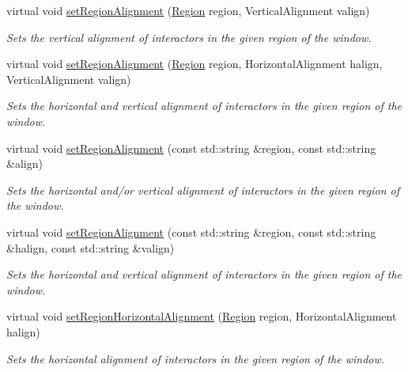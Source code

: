 \begin{DoxyCompactItemize}
virtual void \mbox{\hyperlink{classGWindow_a926942899d029fc9921fe770ac2867bb}{set\+Region\+Alignment}} (\mbox{\hyperlink{classGWindow_a81a01a86de31071a92e6cce0bab9bc4b}{Region}} region, Vertical\+Alignment valign)
\begin{DoxyCompactList}\small\item\em Sets the vertical alignment of interactors in the given region of the window. \end{DoxyCompactList}\item 
virtual void \mbox{\hyperlink{classGWindow_ab4d2bfcca7a18da2847e7b4494da4a16}{set\+Region\+Alignment}} (\mbox{\hyperlink{classGWindow_a81a01a86de31071a92e6cce0bab9bc4b}{Region}} region, Horizontal\+Alignment halign, Vertical\+Alignment valign)
\begin{DoxyCompactList}\small\item\em Sets the horizontal and vertical alignment of interactors in the given region of the window. \end{DoxyCompactList}\item 
virtual void \mbox{\hyperlink{classGWindow_ae4ff46516be9472498c0bf058b496e8b}{set\+Region\+Alignment}} (const std\+::string \&region, const std\+::string \&align)
\begin{DoxyCompactList}\small\item\em Sets the horizontal and/or vertical alignment of interactors in the given region of the window. \end{DoxyCompactList}\item 
virtual void \mbox{\hyperlink{classGWindow_ad1c76be81b3b865f78b0e91f0e1f07d4}{set\+Region\+Alignment}} (const std\+::string \&region, const std\+::string \&halign, const std\+::string \&valign)
\begin{DoxyCompactList}\small\item\em Sets the horizontal and vertical alignment of interactors in the given region of the window. \end{DoxyCompactList}\item 
virtual void \mbox{\hyperlink{classGWindow_aca8f01ef261afca9c843589e8be54134}{set\+Region\+Horizontal\+Alignment}} (\mbox{\hyperlink{classGWindow_a81a01a86de31071a92e6cce0bab9bc4b}{Region}} region, Horizontal\+Alignment halign)
\begin{DoxyCompactList}\small\item\em Sets the horizontal alignment of interactors in the given region of the window. \end{DoxyCompactList}\item 

\end{DoxyCompactItemize}

